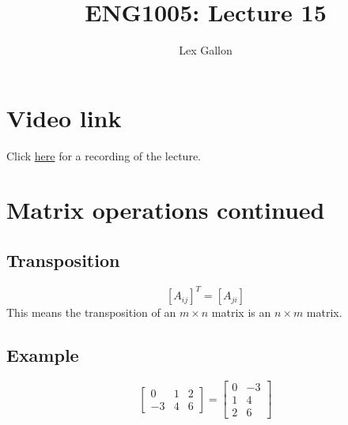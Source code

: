 \documentclass[11pt]{article}
\begin{document}
\title{ENG1005: Lecture 15}
\author{Lex Gallon}
\maketitle

\tableofcontents

\section*{Video link}
Click \href{https://echo360.org.au/lesson/G_35fe23e0-41ee-4e6f-b0f5-05f4155bb7b0_b944cecf-8ba5-40d3-a870-0243a0a9e78c_2020-04-23T15:58:00.000_2020-04-23T16:53:00.000/classroom#sortDirection=desc}{here} for a recording of the lecture.

\section{Matrix operations continued}
\subsection{Transposition}
\[ [A_{ij}]^T = [A_{ji}] \]
This means the transposition of an $m \times n$ matrix is an $n \times m$ matrix.

\subsection{Example}
\[
\begin{bmatrix}
0 & 1 & 2 \\
-3 & 4 & 6
\end{bmatrix}
= \begin{bmatrix}
0 & -3 \\
1 & 4 \\
2 & 6
\end{bmatrix}
\]
\end{document}

